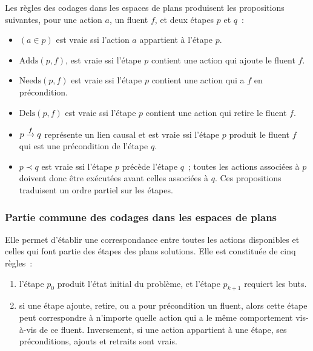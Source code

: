 {Les règles des codages dans les espaces de plans produisent les propositions
suivantes, pour une action $a$, un fluent $f$, et deux étapes $p$ et $q$~:

\begin{itemize}
\item $(a \in p)$ est vraie ssi l'action $a$ appartient à l'étape $p$.
\item $\mathrm{Adds}(p, f)$, est vraie ssi l'étape $p$ contient une action qui ajoute le
  fluent $f$.
\item $\mathrm{Needs}(p, f)$ est vraie ssi l'étape $p$ contient une action qui a $f$ en
  précondition.
\item $\mathrm{Dels}(p, f)$ est vraie ssi l'étape $p$ contient une action qui retire le
  fluent $f$.
\item $p \stackrel{f}{\to} q$ représente un lien causal et est vraie ssi l'étape
  $p$ produit le fluent $f$ qui est une précondition de l'étape $q$.
\item $p \prec q$ est vraie ssi l'étape $p$ précède l'étape $q$~; toutes les actions
  associées à $p$ doivent donc être exécutées avant celles associées à $q$.
  Ces propositions traduisent un ordre partiel sur les étapes.
\end{itemize}


\subsubsection{Partie commune des codages dans les espaces de plans}

Elle permet d'établir une correspondance entre toutes les actions disponibles et
celles qui font partie des étapes des plans solutions. Elle est constituée
de cinq règles~:

\begin{enumerate}
\item {} l'étape $p_0$ produit l'état
  initial du problème, et l'étape $p_{k+1}$ requiert les buts.
\item {} si une étape ajoute, retire, ou a
  pour précondition un fluent, alors cette étape peut correspondre à n'importe
  quelle action qui a le même comportement vis-à-vis de ce fluent. Inversement,
  si une action appartient à une étape, ses préconditions, ajouts et retraits
  sont vrais.


\end{enumerate}}
